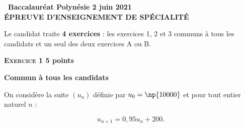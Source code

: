 \documentclass[11pt]{article}
\begin{document}
\setlength\parindent{0mm}
\pagestyle{fancy}
\thispagestyle{empty}

\begin{center}{\Large\textbf{\decofourleft~Baccalauréat Polynésie 2 juin 2021~\decofourright\\[6pt] ÉPREUVE D'ENSEIGNEMENT DE SPÉCIALITÉ }}
\end{center}

\vspace{0,25cm}

Le candidat traite \textbf{4 exercices} : les exercices 1, 2 et 3 communs à tous les candidats et un seul des deux exercices A ou B.

\bigskip

\textbf{\textsc{Exercice 1} \hfill 5 points}

\textbf{Commun à tous les candidats}

\medskip

On considère la suite $\left(u_n\right)$ définie par $u_0 = \np{10000}$ et pour tout entier naturel $n$ : 

\[u_{n+1} = 0,95u_n + 200.\]
\end{document}
